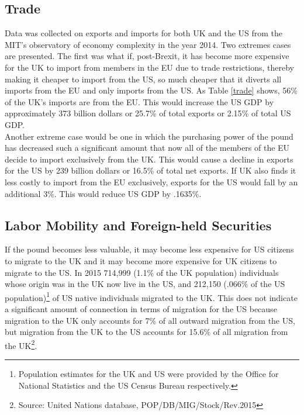 \documentclass[12pt]{article}
\begin{document}
\subsection{Trade}
Data was collected on exports and imports for both UK and the US from the MIT's observatory of economy complexity in the year 2014. Two extremes cases are presented. The first was what if, post-Brexit, it has become more expensive for the UK to import from members in the EU due to trade restrictions, thereby making it cheaper to import from the US, so much cheaper that it diverts all imports from the EU and only imports from the US. As Table \ref{trade} shows, 56$\%$ of the UK's imports are from the EU. This would increase the US GDP by approximately 373 billion dollars or 25.7$\%$ of total exports or 2.15$\%$ of total US GDP.\\

Another extreme case would be one in which the purchasing power of the pound has decreased such a significant amount that now all of the members of the EU decide to import exclusively from the UK. This would cause a decline in exports for the US by 239 billion dollars or 16.5$\%$ of total net exports. If UK also finds it less costly to import from the EU exclusively, exports for the US would fall by an additional 3$\%$. This would reduce US GDP by .1635$\%$.

\subsection{Labor Mobility and Foreign-held Securities}
If the pound becomes less valuable, it may become less expensive for  US citizens to migrate to the UK and it may become more expensive for UK citizens to migrate to the US.
In 2015 714,999 (1.1$\%$ of the UK population) individuals whose origin was in the UK now live in the US, and 212,150 (.066$\%$ of the US population)\footnote{Population estimates for the UK and US were provided by the Office for National Statistics and the US Census Bureau respectively.} of US native individuals migrated to the UK. This does not indicate a significant amount of connection in terms of migration for the US because migration to the UK only accounts for 7$\%$ of all outward migration from the US, but migration from the UK to the US accounts for 15.6$\%$ of all migration from the UK\footnote{Source: United Nations database, POP/DB/MIG/Stock/Rev.2015}. \\
\end{document}
